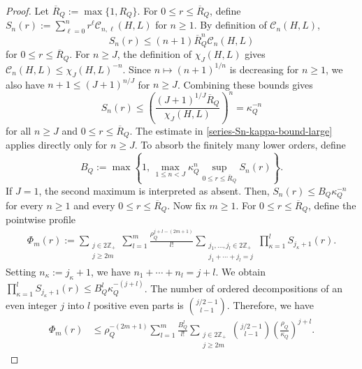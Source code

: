 \documentclass[10pt,reqno]{article}
\numberwithin{equation}{section}
\theoremstyle{plain}
\theoremstyle{definition}
\begin{document}
\begin{proof}
Let \(\overline R_Q:=\max\{1,R_Q\}\). For \(0\leq r\leq \overline R_Q\), define \(S_n(r):=\sum_{\ell=0}^{n}r^\ell\mathcal C_{n,\ell}(H,L)\) for \(n\geq 1\). By definition of \(\mathcal C_n(H,L)\),
\begin{equation}
S_n(r) \leq (n+1)\overline R_Q^n\mathcal C_n(H,L)
\end{equation}
for $0\leq r\leq \overline R_Q$. For \(n\geq J\), the definition of \(\chi_J(H,L)\) gives \(\mathcal C_n(H,L)\leq \chi_J(H,L)^{-n}\). Since \(n\mapsto (n+1)^{1/n}\) is decreasing for \(n\geq 1\), we also have \(n+1\leq (J+1)^{n/J}\) for \(n\geq J\). Combining these bounds gives
\begin{equation}
\label{series-Sn-kappa-bound-large}
S_n(r) \leq \left( \frac{(J+1)^{1/J}\overline R_Q}{\chi_J(H,L)} \right)^n = \kappa_Q^{-n}
\end{equation}
for all \(n\geq J\) and \(0\leq r\leq \overline R_Q\). The estimate in \cref{series-Sn-kappa-bound-large} applies directly only for \(n\geq J\). To absorb the finitely many lower orders, define
\begin{equation}
\label{series-BQ-def}
B_Q := \max\left\{ 1,\, \max_{1\leq n<J} \kappa_Q^n \sup_{0\leq r\leq \overline R_Q}S_n(r) \right\}.
\end{equation}
If \(J=1\), the second maximum is interpreted as absent. Then, $S_n(r)\leq B_Q\kappa_Q^{-n}$ for every \(n\geq 1\) and every \(0\leq r\leq \overline R_Q\). Now fix \(m\geq 1\). For \(0\leq r\leq \overline R_Q\), define the pointwise profile
\begin{align}
\label{series-pointwise-profile-def}
\Phi_m(r) := \sum_{\substack{j\in 2\mathbb Z_+\\ j\geq 2m}} \sum_{l=1}^{m} \frac{\rho_Q^{j+l-(2m+1)}}{l!} \sum_{\substack{j_1,\dots,j_l\in 2\mathbb Z_+\\ j_1+\cdots+j_l=j}} \prod_{\kappa=1}^{l} S_{j_\kappa+1}(r).
\end{align}
Setting \(n_\kappa:=j_\kappa+1\), we have $n_1+\cdots+n_l=j+l$. We obtain $\prod_{\kappa=1}^{l}S_{j_\kappa+1}(r) \leq B_Q^l\kappa_Q^{-(j+l)}$. The number of ordered decompositions of an even integer \(j\) into \(l\) positive even parts is $\binom{j/2-1}{l-1}$. Therefore, we have
\begin{align}
\label{series-pointwise-profile-bound}
\Phi_m(r) &\leq \rho_Q^{-(2m+1)} \sum_{l=1}^{m} \frac{B_Q^l}{l!} \sum_{\substack{j\in 2\mathbb Z_+\\ j\geq 2m}} \binom{j/2-1}{l-1} \left(\frac{\rho_Q}{\kappa_Q}\right)^{j+l}.

\end{align}
\end{proof}
\end{document}
